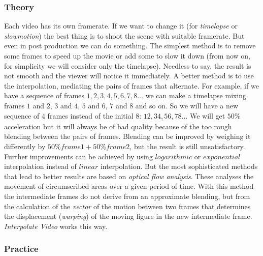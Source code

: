 \subsubsection*{Theory}
\label{ssub:theory}

Each video has its own framerate. If we want to change it (for \textit{timelapse} or \textit{slowmotion}) the best thing is to shoot the scene with suitable framerate. But even in post production we can do something. The simplest method is to remove some frames to speed up the movie or add some to slow it down (from now on, for simplicity we will consider only the timelapse). Needless to say, the result is not smooth and the viewer will notice it immediately. A better method is to use the interpolation, mediating the pairs of frames that alternate. For example, if we have a sequence of frames $1, 2, 3, 4, 5, 6, 7, 8\dots$ we can make a timelapse mixing frames $1$ and $2$, $3$ and $4$, $5$ and $6$, $7$ and $8$ and so on. So we will have a new sequence of $4$ frames instead of the initial $8$: $\underline{12, 34, 56, 78}\dots$ We will get $50\%$ acceleration but it will always be of bad quality because of the too rough blending between the pairs of frames. Blending can be improved by weighing it differently by $50\% frame 1 + 50\% frame 2$, but the result is still unsatisfactory. Further improvements can be achieved by using $logarithmic$ or $exponential$ interpolation instead of $linear$ interpolation. But the most sophisticated methods that lead to better results are based on \textit{optical flow analysis}. These analyses the movement of circumscribed areas over a given period of time. With this method the intermediate frames do not derive from an approximate blending, but from the calculation of the \textit{vector} of the motion between two frames that determines the displacement (\textit{warping}) of the moving figure in the new intermediate frame. \textit{Interpolate Video} works this way.

\subsubsection*{Practice}
\label{ssub:practice}


